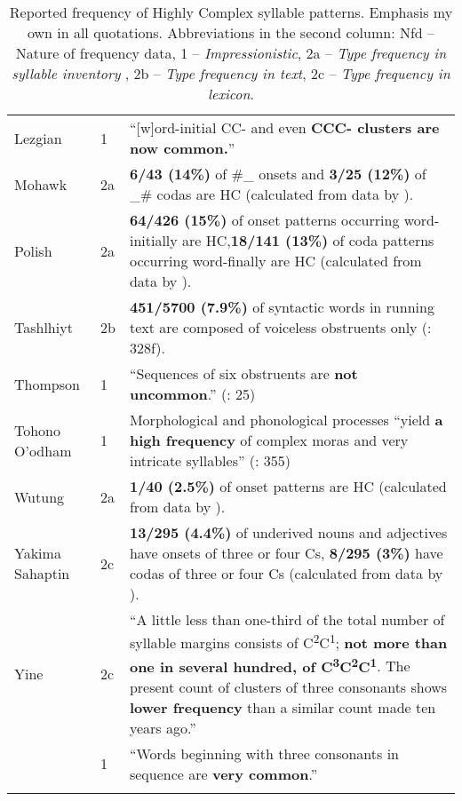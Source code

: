 \begin{sidewaystable}
\begin{tabularx}{\textwidth}{p{1.25cm}lQ}
{Lezgian} & 1 & “[w]ord-initial CC- and even \textbf{{CCC- clusters are now common.}}” 
\citep[46]{Haspelmath1993}\\
{Mohawk} & 2a & \textbf{6/43 {(14\%)}} of \#\_ onsets and \textbf{3/25 {(12\%)}} of \_\# codas are HC (calculated from data by \citealt[12--13]{Michelson1988}).\\
{Polish} & 2a & \textbf{{64/426 (15\%)}} of onset patterns occurring word-initially are HC,\textbf{18/141 (13\%)} of coda patterns occurring word-finally are HC (calculated from data by \citealt{Bargiełowna1950}).\\
{Tashlhiyt} & 2b & \textbf{{451/5700 (7.9\%)}} of syntactic words in running text are composed of voiceless obstruents only (\citealt{Ridouane2008}: 328f).\\
{Thompson} & 1 & “Sequences of six obstruents are\textbf{ \textbf{not} {uncommon}}.” (\citealt{ThompsonThompson1992}: 25)\\
{Tohono O’odham} & 1 & Morphological and phonological processes “yield \textbf{{a high frequency}} of complex moras and very intricate syllables” (\citealt{HillZepeda1992}: 355)\\
{Wutung} & 2a & \textbf{{1/40 (2.5\%)}} of onset patterns are HC (calculated from data by \citealt{Marmion2010}).\\
{Yakima Sahaptin} & 2c & \textbf{{13/295 (4.4\%)}} of underived nouns and adjectives have onsets of three or four Cs, \textbf{{8/295 (3\%)}} have codas of three or four Cs (calculated from data by \citealt{HargusBeavert2006}).\\
{Yine} & 2c & ``A little less than one-third of the total number of syllable margins consists of C\textsuperscript{2}C\textsuperscript{1}; \textbf{{not more than one in several hundred, of C}}\textbf{{\textsuperscript{3}}}\textbf{{C}}\textbf{{\textsuperscript{2}}}\textbf{{C}}\textbf{{\textsuperscript{1}}}. The present count of clusters of three consonants shows \textbf{{lower frequency}} than a similar count made ten years ago.'' \citep[24]{Matteson1965}\\
              & 1 &  “Words beginning with three consonants in sequence are \textbf{{very common}}.” \citep[26]{Hanson2010}\\
\lspbottomrule
\end{tabularx}
\caption{\label{tab:3.14}Reported frequency of Highly Complex syllable patterns. Emphasis my own in all quotations. Abbreviations in the second column: Nfd -- Nature of frequency data, 1 -- \textit{Impressionistic}, 2a -- \textit{Type frequency in syllable inventory
}, 2b -- \textit{Type frequency in text}, 2c -- \textit{Type frequency in lexicon}.}
\end{sidewaystable}

